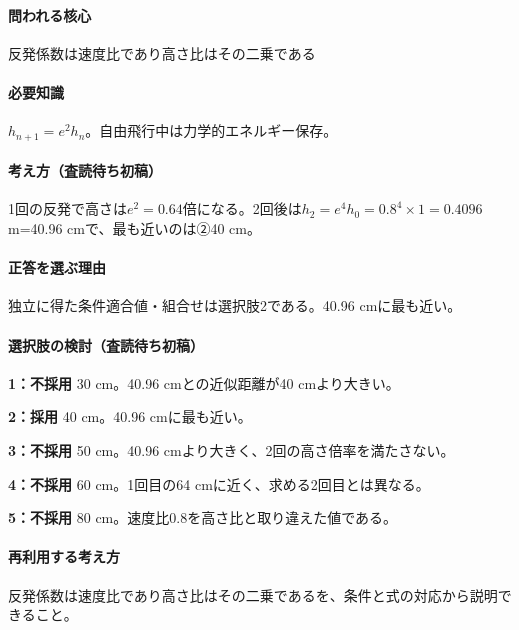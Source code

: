 \paragraph{問われる核心} 反発係数は速度比であり高さ比はその二乗である

\paragraph{必要知識} \(h_{n+1}=e^2h_n\)。自由飛行中は力学的エネルギー保存。

\paragraph{考え方（査読待ち初稿）} 1回の反発で高さは\(e^2=0.64\)倍になる。2回後は\(h_2=e^4h_0=0.8^4\times1=0.4096\) m=\allowbreak{}40.96 cmで、最も近いのは②40 cm。

\paragraph{正答を選ぶ理由} 独立に得た条件適合値・組合せは選択肢2である。40.96 cmに最も近い。

\paragraph{選択肢の検討（査読待ち初稿）}\mbox{}\par

\noindent\textbf{1：不採用} 30 cm。40.96 cmとの近似距離が40 cmより大きい。\par

\noindent\textbf{2：採用} 40 cm。40.96 cmに最も近い。\par

\noindent\textbf{3：不採用} 50 cm。40.96 cmより大きく、2回の高さ倍率を満たさない。\par

\noindent\textbf{4：不採用} 60 cm。1回目の64 cmに近く、求める2回目とは異なる。\par

\noindent\textbf{5：不採用} 80 cm。速度比0.8を高さ比と取り違えた値である。\par

\paragraph{再利用する考え方} 反発係数は速度比であり高さ比はその二乗であるを、条件と式の対応から説明できること。

